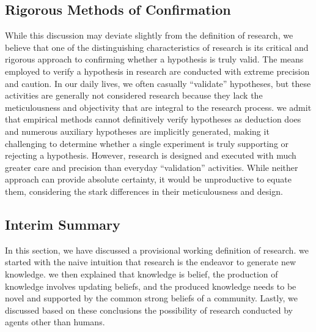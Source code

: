 \documentclass{book}
\begin{document}
\subsection{Rigorous Methods of Confirmation}
While this discussion may deviate slightly from the definition of research, we believe that one of the distinguishing characteristics of research is its critical and rigorous approach to confirming whether a hypothesis is truly valid. The means employed to verify a hypothesis in research are conducted with extreme precision and caution. In our daily lives, we often casually ``validate'' hypotheses, but these activities are generally not considered research because they lack the meticulousness and objectivity that are integral to the research process. we admit that empirical methods cannot definitively verify hypotheses as deduction does and numerous auxiliary hypotheses are implicitly generated, making it challenging to determine whether a single experiment is truly supporting or rejecting a hypothesis. However, research is designed and executed with much greater care and precision than everyday ``validation'' activities. While neither approach can provide absolute certainty, it would be unproductive to equate them, considering the stark differences in their meticulousness and design.


\subsection{Interim Summary}
In this section, we have discussed a provisional working definition of research. we started with the naive intuition that research is the endeavor to generate new knowledge. we then explained that knowledge is belief, the production of knowledge involves updating beliefs, and the produced knowledge needs to be novel and supported by the common strong beliefs of a community. Lastly, we discussed based on these conclusions the possibility of research conducted by agents other than humans.
\end{document}
